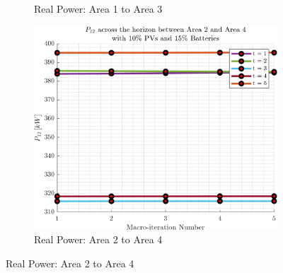 \documentclass[../../outputs/main.tex]{subfiles}
\begin{document}
\begin{figure}[h!]
\begin{subfigure}[b]{0.3\textwidth}
        \caption{\scriptsize Real Power: Area 1 to Area 3}
        \label{fig:real_power_1_3}
    \end{subfigure}
    \hfill
    \begin{subfigure}[b]{0.3\textwidth}
        \centering
        \includegraphics[width=\textwidth]{../figures/T5-pv10-batt15-PBoundary/BoundaryRealPower_vs_t_vs_macroItr_5Areas_2_4_genCost_pv_10_batt_15_.png}
        \caption{\scriptsize Real Power: Area 2 to Area 4}
        \label{fig:real_power_2_4}
    \end{subfigure}
    

\end{figure}
\end{document}
